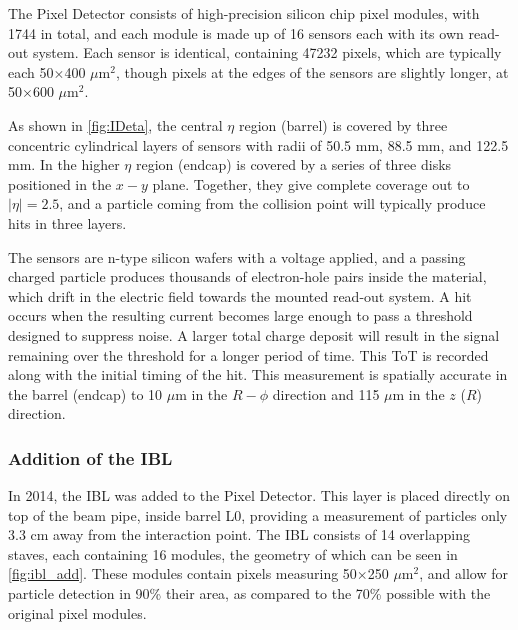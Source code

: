The Pixel Detector consists of high-precision silicon chip pixel modules, with 1744 in total, and each module is made up of 16 sensors each with its own read-out system. Each sensor is identical, containing 47232 pixels, which are typically each 50$\times$400 $\mu$m$^2$, though pixels at the edges of the sensors are slightly longer, at 50$\times$600 $\mu$m$^2$.  

As shown in \autoref{fig:IDeta}, the central $\eta$ region (barrel) is covered by three concentric cylindrical layers of sensors with radii of 50.5 mm, 88.5 mm, and 122.5 mm. In the higher $\eta$ region (endcap) is covered by a series of three disks positioned in the $x-y$ plane. Together, they give complete coverage out to $|\eta| = 2.5$, and a particle coming from the collision point will typically produce hits in three layers. 

The sensors are n-type silicon wafers with a voltage applied, and a passing charged particle produces thousands of electron-hole pairs inside the material, which drift in the electric field towards the mounted read-out system. A hit occurs when the resulting current becomes large enough to pass a threshold designed to suppress noise. A larger total charge deposit will result in the signal remaining over the threshold for a longer period of time. This \ac{ToT} is recorded along with the initial timing of the hit. This measurement is spatially accurate in the barrel (endcap) to 10 $\mu$m in the $R-\phi$ direction and 115 $\mu$m in the $z$ ($R$) direction.  

\subsubsection{Addition of the IBL}

In 2014, the \ac{IBL} was added to the Pixel Detector. This layer is placed directly on top of the beam pipe, inside barrel L0, providing a measurement of particles only 3.3 cm away from the interaction point. The \ac{IBL} consists of 14 overlapping staves, each containing 16 modules, the geometry of which can be seen in \autoref{fig:ibl_add}. These modules contain pixels measuring 50$\times$250 $\mu$m$^2$, and allow for particle detection in 90\% their area, as compared to the 70\% possible with the original pixel modules.

